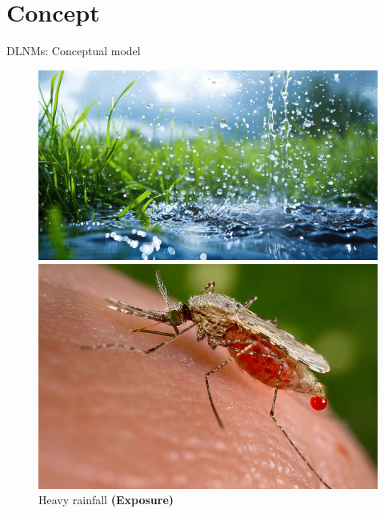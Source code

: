 \documentclass[english]{beamer}
\newcommand{\alertblue}[1]{{\color{blue}#1}}
\begin{document}
\section{Concept}
\begin{frame}{DLNMs: Conceptual model}
\begin{figure}
    \centering
    \begin{minipage}{0.2\linewidth}
        \includegraphics[width=\linewidth]{images/rainfall.jpg}
        \caption{\footnotesize Heavy rainfall \textbf{(Exposure)}}
    \end{minipage}
    \hspace{0.5cm}
    \hspace{0.5cm}
    \begin{minipage}{0.2\linewidth}
        \centering
        \includegraphics[width=\linewidth]{images/malaria.jpeg}

\end{minipage}
\end{figure}
\end{frame}
\end{document}
